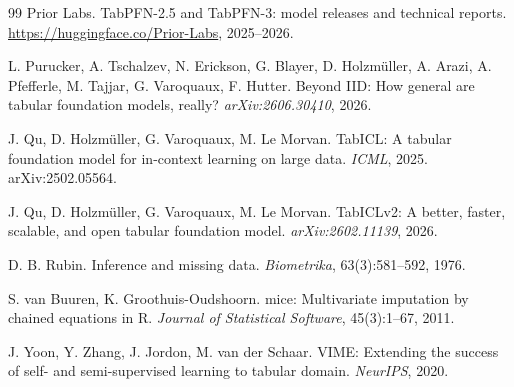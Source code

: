 \documentclass[11pt]{article}
\begin{document}
\begin{thebibliography}{99}
Prior Labs.
TabPFN-2.5 and TabPFN-3: model releases and technical reports.
\url{https://huggingface.co/Prior-Labs}, 2025--2026.

L. Purucker, A. Tschalzev, N. Erickson, G. Blayer, D. Holzm\"uller, A. Arazi, A. Pfefferle, M. Tajjar, G. Varoquaux, F. Hutter.
Beyond IID: How general are tabular foundation models, really?
\emph{arXiv:2606.30410}, 2026.

J. Qu, D. Holzm\"uller, G. Varoquaux, M. Le Morvan.
TabICL: A tabular foundation model for in-context learning on large data.
\emph{ICML}, 2025. arXiv:2502.05564.

J. Qu, D. Holzm\"uller, G. Varoquaux, M. Le Morvan.
TabICLv2: A better, faster, scalable, and open tabular foundation model.
\emph{arXiv:2602.11139}, 2026.

D. B. Rubin.
Inference and missing data.
\emph{Biometrika}, 63(3):581--592, 1976.

S. van Buuren, K. Groothuis-Oudshoorn.
mice: Multivariate imputation by chained equations in R.
\emph{Journal of Statistical Software}, 45(3):1--67, 2011.

J. Yoon, Y. Zhang, J. Jordon, M. van der Schaar.
VIME: Extending the success of self- and semi-supervised learning to tabular domain.
\emph{NeurIPS}, 2020.

\end{thebibliography}
\end{document}
